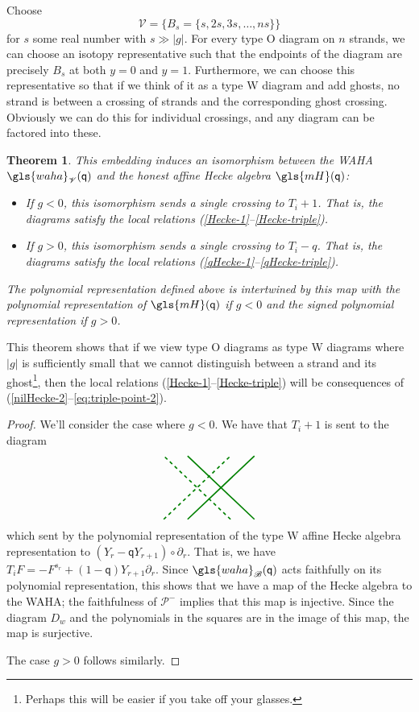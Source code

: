 \documentclass[10pt]{article}
\newtheorem{theorem}{Theorem}[section]
\theoremstyle{definition}
\newcommand{\wellsep}{\mathscr{V}}
\newcommand{\ck}{g}
\newcommand{\pq}{\mathsf{q}}
\newcommand{\cP}{\mathcal{P}}
\newcommand{\waha}{\gls{waha}}
\begin{document}
Choose 
$$
\wellsep =  \{B_s  =  \{s,2s,3s,\dots, ns\}\}
$$
 for $s$ some real
number with $s\gg |g|$. For every type O diagram on $n$ strands,
we can choose an isotopy representative such that the endpoints of the
diagram are precisely $B_s$ at both $y=0$ and $y=1$. Furthermore, we
can choose this representative so that if we think of it as a type W
diagram and add ghosts, no strand is between a crossing
of strands and the corresponding ghost crossing. Obviously we can do
this for individual crossings, and any diagram can be factored into
these.
\begin{theorem}\label{wdHecke}
 This embedding induces an isomorphism between the WAHA $\waha_{\wellsep}(\pq)$ and
 the honest affine Hecke algebra
 $\gls{mH}(\pq)$:
 \begin{itemize}
 \item If $\ck <0$, this isomorphism sends a single crossing to
 $T_i+1$. That is, the diagrams satisfy the local relations
 (\ref{Hecke-1}--\ref{Hecke-triple}).
\item If $\ck>0$, this
 isomorphism sends a single crossing to $T_i-q$. That is, the diagrams satisfy the local relations
 (\ref{qHecke-1}--\ref{qHecke-triple}).
 \end{itemize}
The polynomial representation defined above
 is intertwined by this map with the polynomial representation of
 $\gls{mH}(\pq)$ if $\ck <0$ and the signed polynomial representation if $\ck>0$. 
\end{theorem}
This theorem shows that if we view type O diagrams as type W diagrams
where $|\ck|$ is sufficiently small that we cannot distinguish
between a strand and its ghost\footnote{Perhaps this will be easier if
 you take off your glasses.}, then the local relations
(\ref{Hecke-1}--\ref{Hecke-triple}) will be consequences of (\ref{nilHecke-2}--\ref{eq:triple-point-2}).
\begin{proof}
We'll consider the case where $\ck <0$. We have that $T_i+1$ is sent to the diagram 
\begin{equation*}
 \begin{tikzpicture}[very thick,xscale=1.5,baseline,green!50!black]
 \draw (-2.5,0) +(.7,-1) -- +(-.7,1);
 \draw (-2.5,0) +(-.7,-1) -- +(.7,1); 
 \draw[dashed] (-3,0) +(.7,-1) -- +(-.7,1);
 \draw [dashed] (-3,0) +(-.7,-1) -- +(.7,1); 
 \end{tikzpicture}
 \end{equation*}
which sent by the polynomial representation of the type W affine Hecke algebra
 representation to $(Y_r-\pq Y_{r+1}) \circ \partial_r$. That is, we
 have $T_iF=-F^{s_r}+(1-\pq)Y_{r+1}\partial_r$. Since
 $\waha_{\mathscr{B}}(\pq)$ acts faithfully on its polynomial representation,
 this shows that we have a map of the Hecke algebra to the WAHA; the
 faithfulness of $\cP^-$ implies that this map is injective. 
 Since the diagram $D_w$ and the polynomials in the squares are in
 the image of this map, the map is surjective. 

The case $\ck>0$ follows similarly.
\end{proof}
\end{document}
